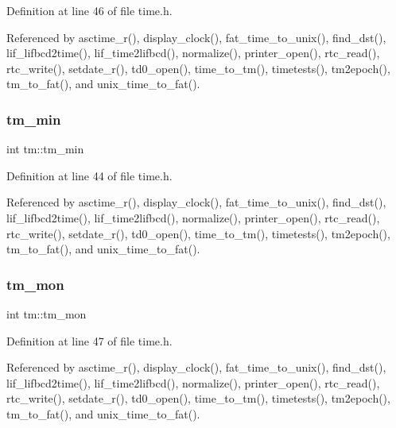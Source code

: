 Definition at line 46 of file time.\+h.



Referenced by asctime\+\_\+r(), display\+\_\+clock(), fat\+\_\+time\+\_\+to\+\_\+unix(), find\+\_\+dst(), lif\+\_\+lifbcd2time(), lif\+\_\+time2lifbcd(), normalize(), printer\+\_\+open(), rtc\+\_\+read(), rtc\+\_\+write(), setdate\+\_\+r(), td0\+\_\+open(), time\+\_\+to\+\_\+tm(), timetests(), tm2epoch(), tm\+\_\+to\+\_\+fat(), and unix\+\_\+time\+\_\+to\+\_\+fat().

\mbox{\label{structtm_af414eb7c86cc3099595211eee4d4211b}} 
\subsubsection{\texorpdfstring{tm\+\_\+min}{tm\_min}}
{\footnotesize\ttfamily int tm\+::tm\+\_\+min}



Definition at line 44 of file time.\+h.



Referenced by asctime\+\_\+r(), display\+\_\+clock(), fat\+\_\+time\+\_\+to\+\_\+unix(), find\+\_\+dst(), lif\+\_\+lifbcd2time(), lif\+\_\+time2lifbcd(), normalize(), printer\+\_\+open(), rtc\+\_\+read(), rtc\+\_\+write(), setdate\+\_\+r(), td0\+\_\+open(), time\+\_\+to\+\_\+tm(), timetests(), tm2epoch(), tm\+\_\+to\+\_\+fat(), and unix\+\_\+time\+\_\+to\+\_\+fat().

\mbox{\label{structtm_a112ac36fa2f593777138a417cf031e17}} 
\subsubsection{\texorpdfstring{tm\+\_\+mon}{tm\_mon}}
{\footnotesize\ttfamily int tm\+::tm\+\_\+mon}



Definition at line 47 of file time.\+h.



Referenced by asctime\+\_\+r(), display\+\_\+clock(), fat\+\_\+time\+\_\+to\+\_\+unix(), find\+\_\+dst(), lif\+\_\+lifbcd2time(), lif\+\_\+time2lifbcd(), normalize(), printer\+\_\+open(), rtc\+\_\+read(), rtc\+\_\+write(), setdate\+\_\+r(), td0\+\_\+open(), time\+\_\+to\+\_\+tm(), timetests(), tm2epoch(), tm\+\_\+to\+\_\+fat(), and unix\+\_\+time\+\_\+to\+\_\+fat().


